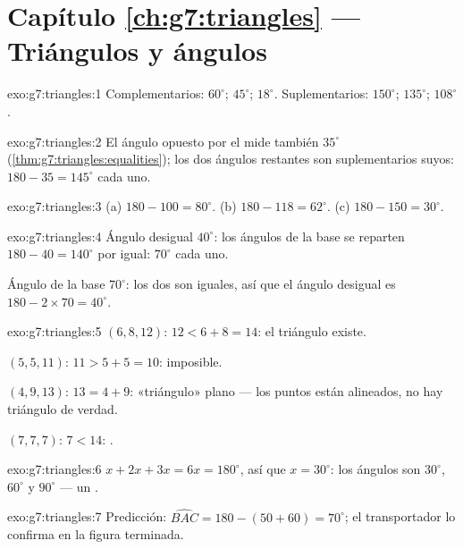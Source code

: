 \section*{Capítulo \ref{ch:g7:triangles} --- Triángulos y ángulos}

\begin{solution}{exo:g7:triangles:1}
Complementarios: $60^\circ$; $45^\circ$; $18^\circ$.
Suplementarios: $150^\circ$; $135^\circ$; $108^\circ$.
\end{solution}

\begin{solution}{exo:g7:triangles:2}
El ángulo opuesto por el  mide también $35^\circ$
(\cref{thm:g7:triangles:equalities}); los dos ángulos restantes son
suplementarios suyos: $180 - 35 = 145^\circ$ cada uno.
\end{solution}

\begin{solution}{exo:g7:triangles:3}
(a) $180 - 100 = 80^\circ$. \quad
(b) $180 - 118 = 62^\circ$. \quad
(c) $180 - 150 = 30^\circ$.
\end{solution}

\begin{solution}{exo:g7:triangles:4}
Ángulo desigual $40^\circ$: los ángulos de la base se reparten $180 - 40 = 140^\circ$
por igual: $70^\circ$ cada uno.

Ángulo de la base $70^\circ$: los dos son iguales, así que el ángulo desigual es
$180 - 2 \times 70 = 40^\circ$.
\end{solution}

\begin{solution}{exo:g7:triangles:5}
$(6, 8, 12)$: $12 < 6 + 8 = 14$: el triángulo existe.

$(5, 5, 11)$: $11 > 5 + 5 = 10$: imposible.

$(4, 9, 13)$: $13 = 4 + 9$: «triángulo» plano --- los puntos están
alineados, no hay triángulo de verdad.

$(7, 7, 7)$: $7 < 14$: .
\end{solution}

\begin{solution}{exo:g7:triangles:6}
$x + 2x + 3x = 6x = 180^\circ$, así que $x = 30^\circ$: los ángulos son
$30^\circ$, $60^\circ$ y $90^\circ$ --- un .
\end{solution}

\begin{solution}{exo:g7:triangles:7}
Predicción: $\widehat{BAC} = 180 - (50 + 60) = 70^\circ$; el
transportador lo confirma en la figura terminada.
\end{solution}

